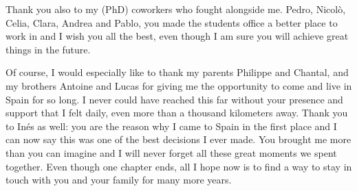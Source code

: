 \documentclass[a4paper, 10pt, openright]{report}
\begin{document}
Thank you also to my (PhD) coworkers who fought alongside me. Pedro, Nicol\`{o}, Celia, Clara, Andrea and Pablo, you made the students office a better place to work in and I wish you all the best, even though I am sure you will achieve great things in the future.

Of course, I would especially like to thank my parents Philippe and Chantal, and my brothers Antoine and Lucas for giving me the opportunity to come and live in Spain for so long. I never could have reached this far without your presence and support that I felt daily, even more than a thousand kilometers away. Thank you to In\'{e}s as well: you are the reason why I came to Spain in the first place and I can now say this was one of the best decisions I ever made. You brought me more than you can imagine and I will never forget all these great moments we spent together. Even though one chapter ends, all I hope now is to find a way to stay in touch with you and your family for many more years.
\fi 

\newpage

%
\end{document}
